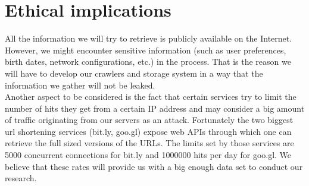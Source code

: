\documentclass{article}
\begin{document}
\section{Ethical implications}
All the information we will try to retrieve is publicly available on the Internet. However, we might encounter sensitive information (such as user preferences, birth dates, network configurations, etc.) in the process. That is the reason we will have to develop our crawlers and storage system in a way that the information we gather will not be leaked.\\
Another aspect to be considered is the fact that certain services try to limit the number of hits they get from a certain IP address and may consider a big amount of traffic originating from our servers as an attack. Fortunately the two biggest url shortening services (bit.ly, goo.gl) expose web APIs through which one can retrieve the full sized versions of the URLs. The limits set by those services are 5000 concurrent connections for bit.ly and 1000000 hits per day for goo.gl. We believe that these rates will provide us with a big enough data set to conduct our research. 
\end{document}
